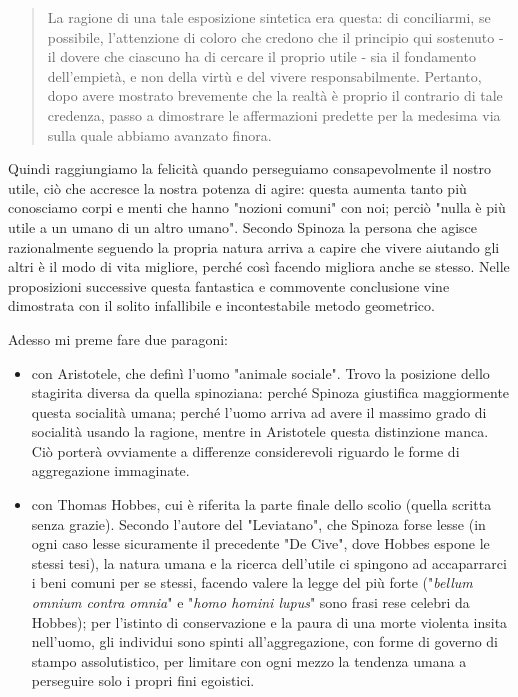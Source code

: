\begin{quotation}
	\textsf{La ragione di una tale esposizione sintetica era questa: di conciliarmi, se possibile, l’attenzione di coloro che credono che il principio qui sostenuto - il dovere che ciascuno ha di cercare il proprio utile - sia il fondamento dell’empietà, e non della virtù e del
	vivere responsabilmente.} Pertanto, dopo avere mostrato brevemente che la realtà è proprio
	il contrario di tale credenza, passo a dimostrare le affermazioni predette per la medesima
	via sulla quale abbiamo avanzato finora.
\end{quotation}

Quindi raggiungiamo la felicità quando perseguiamo consapevolmente il nostro utile, ciò che accresce la nostra potenza di agire: questa aumenta tanto più conosciamo corpi e menti che hanno "nozioni comuni" con noi; perciò "nulla è più utile a un umano di un altro umano". Secondo Spinoza la persona che agisce razionalmente seguendo la propria natura arriva a capire che vivere aiutando gli altri è il modo di vita migliore, perché così facendo migliora anche se stesso. Nelle proposizioni successive questa fantastica e commovente conclusione vine dimostrata con il solito infallibile e incontestabile metodo geometrico. 

Adesso mi preme fare due paragoni:
\begin{itemize}
	\item con Aristotele, che definì l'uomo "animale sociale". Trovo la posizione dello stagirita diversa da quella spinoziana: perché Spinoza giustifica maggiormente questa socialità umana; perché l'uomo arriva ad avere il massimo grado di socialità usando la ragione, mentre in Aristotele questa distinzione manca. Ciò porterà ovviamente a differenze considerevoli riguardo le forme di aggregazione immaginate.
	\item con Thomas Hobbes, cui è riferita la parte finale dello scolio (quella scritta senza grazie). Secondo l'autore del "Leviatano", che Spinoza forse lesse (in ogni caso lesse sicuramente il precedente "De Cive", dove Hobbes espone le stessi tesi), la natura umana e la ricerca dell'utile ci spingono ad accaparrarci i beni comuni per se stessi, facendo valere la legge del più forte ("\textit{bellum omnium contra omnia}" e "\textit{homo homini lupus}" sono frasi rese celebri da Hobbes); per l'istinto di conservazione e la paura di una morte violenta insita nell'uomo, gli individui sono spinti all'aggregazione, con forme di governo di stampo assolutistico, per limitare con ogni mezzo la tendenza umana a perseguire solo i propri fini egoistici.
\end{itemize}

